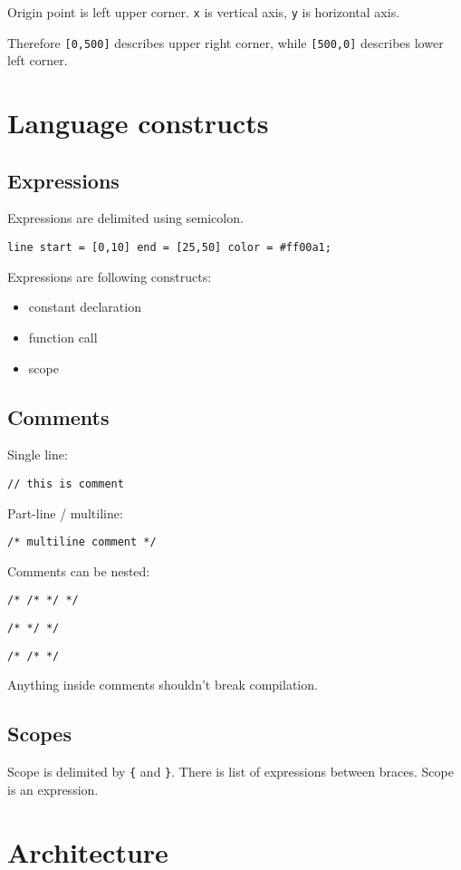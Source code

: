 \documentclass{scrreprt}
\begin{document}
Origin point is left upper corner. \texttt{x} is vertical axis, \texttt{y} is horizontal axis.

Therefore \texttt{[0,500]} describes upper right corner, while \texttt{[500,0]} describes lower left corner.

\chapter{Language constructs}

\section{Expressions}

Expressions are delimited using semicolon.

\texttt{line start = [0,10] end = [25,50] color = \#ff00a1;}

Expressions are following constructs:

\begin{itemize}
    \item constant declaration
    \item function call
    \item scope
\end{itemize}

\section{Comments}

Single line:

\texttt{// this is comment}

Part-line / multiline:

\texttt{/* multiline comment */}

Comments can be nested:

\texttt{/* /* */ */}

\texttt{/* */ */}

\texttt{/* /* */}

Anything inside comments shouldn't break compilation.

\section{Scopes}

Scope is delimited by \texttt{\{} and \texttt{\}}. There is list of expressions between braces. Scope is an expression.

\chapter{Architecture}
\end{document}
